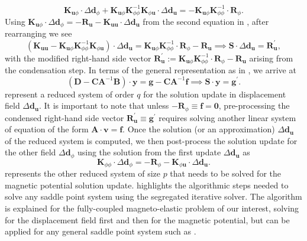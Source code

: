 \documentclass[11pt,a4paper,final]{article}
\begin{document}
\begin{equation}
\mathbf{K}_{\mathbf{u} \phi} \cdot \Delta \mathbf{d}_{\phi} +  \mathbf{K}_{\mathbf{u} \phi} \mathbf{K}_{\phi \phi}^{-1} \mathbf{K}_{\phi \mathbf{u}} \cdot \Delta \mathbf{d}_{\mathbf{u}} = -\mathbf{K}_{\mathbf{u} \phi} \mathbf{K}_{\phi \phi}^{-1} \cdot \mathbf{R}_{\phi}.
\end{equation}
Using $\mathbf{K}_{\mathbf{u} \phi} \cdot \Delta \mathbf{d}_{\phi} = -\mathbf{R}_{\mathbf{u}} - \mathbf{K}_{\mathbf{u} \mathbf{u}} \cdot \Delta \mathbf{d}_{\mathbf{u}}$ from the second equation in , after rearranging we see
\begin{equation}
\left( \mathbf{K}_{\mathbf{u} \mathbf{u}} - \mathbf{K}_{\mathbf{u} \phi} \mathbf{K}_{\phi \phi}^{-1} \mathbf{K}_{\phi \mathbf{u}} \right) \cdot \Delta \mathbf{d}_{\mathbf{u}} = \mathbf{K}_{\mathbf{u} \phi} \mathbf{K}_{\phi \phi}^{-1} \cdot \mathbf{R}_{\phi} - \mathbf{R}_{\mathbf{u}} \implies \mathbf{S} \cdot \Delta \mathbf{d}_{\mathbf{u}} = \mathbf{R}_{\mathbf{u}}^',
\label{eq:3.19}
\end{equation}
with the modified right-hand side vector $\mathbf{R}_{\mathbf{u}}^' := \mathbf{K}_{\mathbf{u} \phi} \mathbf{K}_{\phi \phi}^{-1} \cdot \mathbf{R}_{\phi} - \mathbf{R}_{\mathbf{u}}$ arising from the condensation step.
In terms of the general representation as in , we arrive at
\begin{equation}
\left( \mathbf{D} - \mathbf{C} \mathbf{A}^{-1} \mathbf{B} \right) \cdot \mathbf{y} = \mathbf{g} - \mathbf{C} \mathbf{A}^{-1} \mathbf{f} \implies \mathbf{S} \cdot \mathbf{y} = \mathbf{g}^'.
\label{eq:3.20} 
\end{equation}
 represent a reduced system of order $q$ for the solution update in displacement field $\Delta \mathbf{d}_{\mathbf{u}}$. It is important to note that unless $-\mathbf{R}_{\phi} \equiv \mathbf{f} = \mathbf{0}$, pre-processing the condensed right-hand side vector $\mathbf{R}_{\mathbf{u}}^' \equiv \mathbf{g}^'$ requires solving another linear system of equation of the form $\mathbf{A} \cdot \mathbf{v} = \mathbf{f}$. Once the solution (or an approximation) $\Delta \mathbf{d}_{\mathbf{u}}$ of the reduced system  is computed, we then post-process the solution update for the other field $\Delta \mathbf{d}_{\phi}$ using the solution from the first update $\Delta \mathbf{d}_{\mathbf{u}}$ as
\begin{equation}
\mathbf{K}_{\phi \phi} \cdot \Delta \mathbf{d}_{\phi} = -\mathbf{R}_{\phi} - \mathbf{K}_{\phi \mathbf{u}} \cdot \Delta \mathbf{d}_{\mathbf{u}}.
\label{eq:3.21}
\end{equation}
 represents the other reduced system of size $p$ that needs to be solved for the magnetic potential solution update.  highlights the algorithmic steps needed to solve any saddle point system using the segregated iterative solver. The algorithm is explained for the fully-coupled magneto-elastic problem of our interest, solving for the displacement field first and then for the magnetic potential, but can be applied for any general saddle point system such as . \newline \par 
\end{document}
